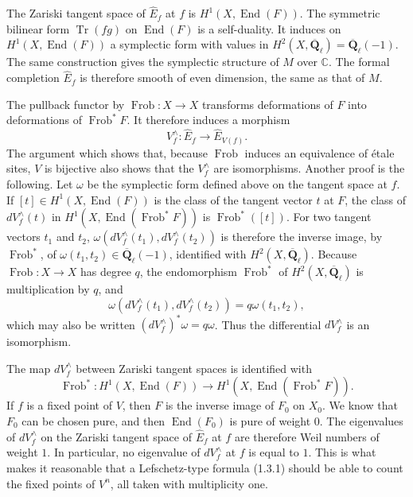 \documentclass[11pt]{article}
\newcommand{\Qbl}{\overline{\mathbf{Q}}_{\ell}}
\newcommand{\Frob}{\operatorname{Frob}}
\newcommand{\End}{\operatorname{End}}
\newcommand{\Tr}{\operatorname{Tr}}
\begin{document}
The Zariski tangent space of \(\widehat{E}_f\) at \(f\) is \(H^1(X,\End(F))\). The symmetric bilinear form \(\Tr(fg)\) on \(\End(F)\) is a self-duality. It induces on \(H^1(X,\End(F))\) a symplectic form with values in \(H^2(X,\Qbl)=\Qbl(-1)\). The same construction gives the symplectic structure of \(M\) over \(\mathbb{C}\). The formal completion \(\widehat{E}_f\) is therefore smooth of even dimension, the same as that of \(M\).

The pullback functor by \(\Frob:X\to X\) transforms deformations of \(F\) into deformations of \(\Frob^*F\). It therefore induces a morphism
\[
V_f^{\wedge}:\widehat{E}_f\longrightarrow \widehat{E}_{V(f)}.
\]
The argument which shows that, because \(\Frob\) induces an equivalence of étale sites, \(V\) is bijective also shows that the \(V_f^{\wedge}\) are isomorphisms. Another proof is the following. Let \(\omega\) be the symplectic form defined above on the tangent space at \(f\). If \([t]\in H^1(X,\End(F))\) is the class of the tangent vector \(t\) at \(F\), the class of \(dV_f^{\wedge}(t)\) in \(H^1(X,\End(\Frob^*F))\) is \(\Frob^*([t])\). For two tangent vectors \(t_1\) and \(t_2\), \(\omega(dV_f^{\wedge}(t_1),dV_f^{\wedge}(t_2))\) is therefore the inverse image, by \(\Frob^*\), of \(\omega(t_1,t_2)\in\Qbl(-1)\), identified with \(H^2(X,\Qbl)\). Because \(\Frob:X\to X\) has degree \(q\), the endomorphism \(\Frob^*\) of \(H^2(X,\Qbl)\) is multiplication by \(q\), and
\[
\omega(dV_f^{\wedge}(t_1),dV_f^{\wedge}(t_2))=q\omega(t_1,t_2),
\]
which may also be written \((dV_f^{\wedge})^*\omega=q\omega\). Thus the differential \(dV_f^{\wedge}\) is an isomorphism.

The map \(dV_f^{\wedge}\) between Zariski tangent spaces is identified with
\[
\Frob^*:H^1(X,\End(F))\longrightarrow H^1(X,\End(\Frob^*F)).
\]
If \(f\) is a fixed point of \(V\), then \(F\) is the inverse image of \(F_0\) on \(X_0\). We know that \(F_0\) can be chosen pure, and then \(\End(F_0)\) is pure of weight \(0\). The eigenvalues of \(dV_f^{\wedge}\) on the Zariski tangent space of \(\widehat{E}_f\) at \(f\) are therefore Weil numbers of weight \(1\). In particular, no eigenvalue of \(dV_f^{\wedge}\) at \(f\) is equal to \(1\). This is what makes it reasonable that a Lefschetz-type formula (1.3.1) should be able to count the fixed points of \(V^n\), all taken with multiplicity one.
\end{document}
